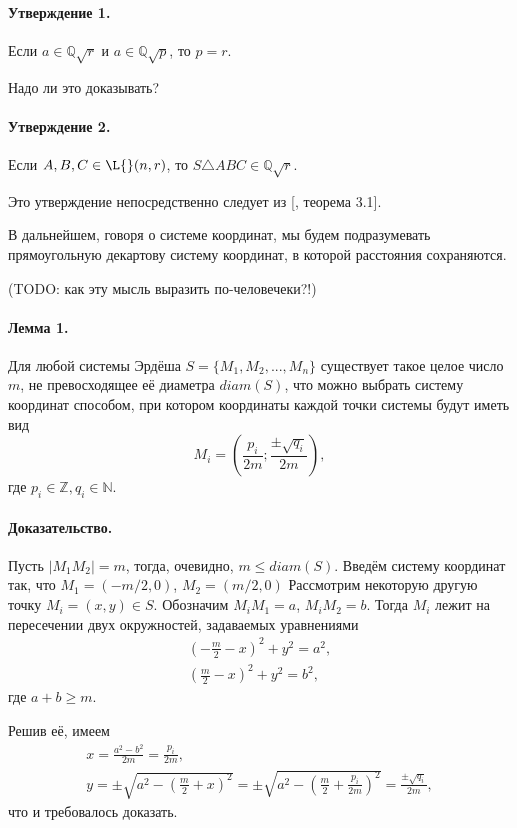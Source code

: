 \documentclass[a4paper,14pt]{article} %
\begin{document}
\paragraph{Утверждение 1.}
Если $a\in\mathbb{Q}\sqrt{r}$ и $a\in\mathbb{Q}\sqrt{p}$, то $p=r$.

Надо ли это доказывать?


\paragraph{Утверждение 2.}
Если $A,B,C\in\L{}(n,r)$, то $S\triangle ABC \in \mathbb{Q}\sqrt{r}$.

Это утверждение непосредственно следует из [\cite{polygons-on-lattices}, теорема 3.1].

В дальнейшем, говоря о системе координат,
мы будем подразумевать прямоугольную декартову систему координат,
в которой расстояния сохраняются.

(TODO: как эту мысль выразить по-человечеки?!)


\paragraph{Лемма 1.}

Для любой системы Эрдёша $S=\{M_1, M_2, ..., M_n\}$ существует такое целое число $m$, не превосходящее её диаметра $diam(S)$,
что можно выбрать систему координат способом, при котором координаты каждой точки системы будут иметь вид
\begin{equation}
	M_i = \left(
		\frac{p_i}{2m}
		;
		\frac{\pm\sqrt{q_i}}{2m}
	\right),
\end{equation}
где $p_i \in \mathbb{Z}, q_i \in \mathbb{N}$.


\paragraph{Доказательство.}
Пусть $|M_1 M_2| = m$, тогда, очевидно, $m \leq diam(S)$.
Введём систему координат так, что $M_1=(-m/2, 0)$, $M_2=(m/2, 0)$
Рассмотрим некоторую другую точку $M_i=(x, y)\in S$.
Обозначим $M_i M_1 = a$, $M_i M_2 = b$.
Тогда $M_i$ лежит на пересечении двух окружностей,
задаваемых уравнениями
\begin{gather}
	\left(-\frac{m}{2} - x\right)^2 + y ^2 = a^2,
\\
	\left( \frac{m}{2} - x\right)^2 + y ^2 = b^2,
\end{gather}
где $a+b\geq m$.

Решив её, имеем
\begin{gather}
	x = \frac{a^2 - b^2}{2 m} = \frac{p_i}{2m},
\\
	y = \pm\sqrt{a^2 - \left(\frac{m}{2}+x\right)^2} =
	\pm\sqrt{a^2 - \left(\frac{m}{2}+\frac{p_i}{2m}\right)^2} =
	\frac{\pm\sqrt{q_i}}{2m},
\end{gather}
что и требовалось доказать.
\end{document}
